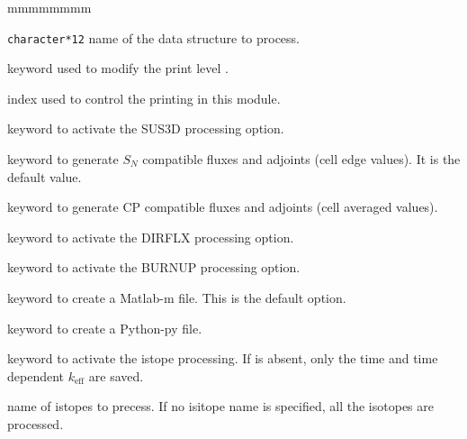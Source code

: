 \begin{ListeDeDescription}{mmmmmmmm}
\item[\dusa{BURNUP}] \verb|character*12| name of the  data structure to process.

\item[\moc{EDIT}] keyword used to modify the print level .

\item[\dusa{iprint}] index used to control the printing in this module. 

\item[\moc{SUS3D}] keyword to activate the SUS3D processing option.

\item[\moc{SN}] keyword to generate $S_N$ compatible fluxes and adjoints (cell edge values). It is the default value.  

\item[\moc{CP}] keyword to generate CP compatible fluxes and adjoints (cell averaged values).

\item[\moc{DIRFLX}] keyword to activate the DIRFLX processing option.

\item[\moc{BURNUP}] keyword to activate the BURNUP processing option.

\item[\moc{MATLAB}] keyword to create a Matlab-m file. This is the default option.

\item[\moc{PYTHON}] keyword to create a Python-py file.

\item[\moc{ISOP}] keyword to activate the istope processing. If  is absent, only the time and time dependent $k_{\text{eff}}$ are saved.

\item[\moc{NAMISO}] name of istopes to precess. If no isitope name is specified, all the isotopes are processed.

\end{ListeDeDescription}

\eject
